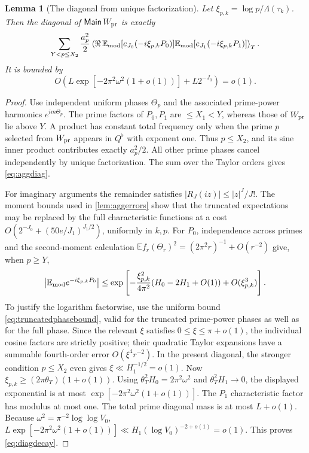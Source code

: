 \documentclass[11pt,reqno]{amsart}
\numberwithin{equation}{section}
\newtheorem{lemma}[theorem]{Lemma}
\newcommand{\av}[1]{\left\langle #1\right\rangle_T}
\begin{document}
\begin{lemma}[The diagonal from unique factorization]\label{lem:aggdiag}
Let
$\xi_{p,k}=\log p/\Lambda(\tau_k)$.
Then the diagonal of $\mathsf{Main}\,W_{\rm pr}$ is exactly
\begin{equation}\label{eq:aggdiag}
\sum_{Y<p\le X_2}\frac{a_p^2}{2}
\av{\Re\,\mathbb E_{\rm mod}
 [e_{J_0}(-i\xi_{p,k}P_0)]
 \mathbb E_{\rm mod}[e_{J_1}(-i\xi_{p,k}P_1)]}.
\end{equation}
It is bounded by
\begin{equation}\label{eq:diagdecay}
O\left(L\exp[-2\pi^2\omega^2(1+o(1))]
 +L2^{-J_0}\right)=o(1).
\end{equation}
\end{lemma}
\begin{proof}
Use independent uniform phases $\Theta_p$ and the associated
prime-power harmonics $e^{im\Theta_p}$.
The prime factors of $P_0,P_1$ are $\le X_1<Y$, whereas those of
$W_{\rm pr}$ lie above $Y$.  A product has constant total frequency
only when the prime $p$ selected from $W_{\rm pr}$ appears in
$Q^\flat$ with exponent one.  Thus $p\le X_2$, and its sine
inner product contributes exactly $a_p^2/2$.
All other prime phases cancel independently by unique factorization.
The sum over the Taylor orders gives \eqref{eq:aggdiag}.

For imaginary arguments the remainder satisfies
$|R_J(iz)|\le|z|^J/J!$.  The moment bounds used in
\cref{lem:aggerrors} show that the truncated expectations
may be replaced by the full characteristic functions at a cost
$O(2^{-J_0}+(50e/J_1)^{J_1/2})$, uniformly in $k,p$.
For $P_0$, independence across primes and the second-moment
calculation
$\mathbb E f_r(\Theta_r)^2=(2\pi^2r)^{-1}+O(r^{-2})$
give, when $p\ge Y$,
\[
\left|\mathbb E_{\rm mod}e^{-i\xi_{p,k}P_0}\right|
\le\exp\left[-\frac{\xi_{p,k}^2}{4\pi^2}
  (H_0-2H_1+O(1))+O(\xi_{p,k}^3)\right].
\]
To justify the logarithm factorwise, use the uniform bound
\eqref{eq:truncatedphasebound}, valid for the truncated prime-power
phases as well as for the full phase.  Since the relevant $\xi$
satisfies $0\le\xi\le\pi+o(1)$, the individual cosine factors
are strictly positive; their quadratic Taylor expansions have a
summable fourth-order error $O(\xi^4r^{-2})$.  In the present
diagonal, the stronger condition $p\le X_2$ even gives
$\xi\ll H_1^{-1/2}=o(1)$.  Now
$\xi_{p,k}\ge(2\pi\theta_T)(1+o(1))$.
Using $\theta_T^2H_0=2\pi^2\omega^2$ and
$\theta_T^2H_1\to0$, the displayed exponential is at most
$\exp[-2\pi^2\omega^2(1+o(1))]$.
The $P_1$ characteristic factor has modulus at most one.
The total prime diagonal mass is at most $L+o(1)$.
Because $\omega^2=\pi^{-2}\log\log V_0$,
$L\exp[-2\pi^2\omega^2(1+o(1))]
\ll H_1(\log V_0)^{-2+o(1)}=o(1)$.
This proves \eqref{eq:diagdecay}.
\end{proof}
\end{document}
